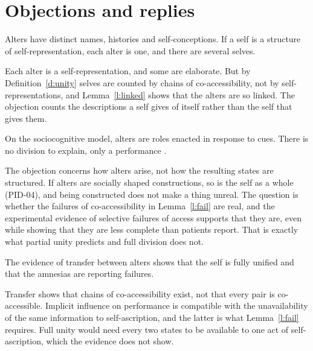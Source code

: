 \documentclass{situationist-preprint}
\begin{document}
\section{Objections and replies}

\begin{objection}
Alters have distinct names, histories and self-conceptions. If a self is a structure of self-representation, each alter is one, and there are several selves.
\end{objection}

\begin{reply}
Each alter is a self-representation, and some are elaborate. But by Definition~\ref{d:unity} selves are counted by chains of co-accessibility, not by self-representations, and Lemma~\ref{l:linked} shows that the alters are so linked. The objection counts the descriptions a self gives of itself rather than the self that gives them.
\end{reply}

\begin{objection}[Enactment]
On the sociocognitive model, alters are roles enacted in response to cues. There is no division to explain, only a performance \citep{Spanos1994}.
\end{objection}

\begin{reply}
The objection concerns how alters arise, not how the resulting states are structured. If alters are socially shaped constructions, so is the self as a whole (PID-04), and being constructed does not make a thing unreal. The question is whether the failures of co-accessibility in Lemma~\ref{l:fail} are real, and the experimental evidence of selective failures of access supports that they are, even while showing that they are less complete than patients report. That is exactly what partial unity predicts and full division does not.
\end{reply}

\begin{objection}
The evidence of transfer between alters shows that the self is fully unified and that the amnesias are reporting failures.
\end{objection}

\begin{reply}
Transfer shows that chains of co-accessibility exist, not that every pair is co-accessible. Implicit influence on performance is compatible with the unavailability of the same information to self-ascription, and the latter is what Lemma~\ref{l:fail} requires. Full unity would need every two states to be available to one act of self-ascription, which the evidence does not show.
\end{reply}
\end{document}
